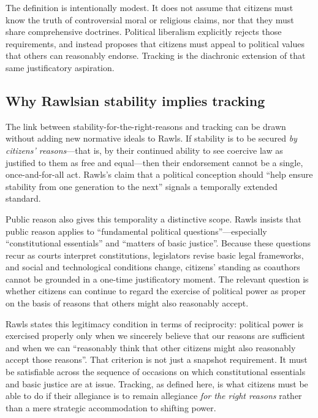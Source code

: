 \documentclass[12pt]{report}
\begin{document}
The definition is intentionally modest. It does not assume that citizens must know the truth of controversial moral or religious claims, nor that they must share comprehensive doctrines. Political liberalism explicitly rejects those requirements, and instead proposes that citizens must appeal to political values that others can reasonably endorse.\parencite[p.~765]{rawls1997public} Tracking is the diachronic extension of that same justificatory aspiration.

\subsection{Why Rawlsian stability implies tracking}

The link between stability-for-the-right-reasons and tracking can be drawn without adding new normative ideals to Rawls. If stability is to be secured \emph{by citizens’ reasons}---that is, by their continued ability to see coercive law as justified to them as free and equal---then their endorsement cannot be a single, once-and-for-all act. Rawls’s claim that a political conception should \enquote{help ensure stability from one generation to the next} signals a temporally extended standard.\parencite[p.~1]{rawls1987overlapping}

Public reason also gives this temporality a distinctive scope. Rawls insists that public reason applies to \enquote{fundamental political questions}---especially \enquote{constitutional essentials} and \enquote{matters of basic justice}.\parencite[p.~767]{rawls1997public} Because these questions recur as courts interpret constitutions, legislators revise basic legal frameworks, and social and technological conditions change, citizens’ standing as coauthors cannot be grounded in a one-time justificatory moment. The relevant question is whether citizens can continue to regard the exercise of political power as proper on the basis of reasons that others might also reasonably accept.

Rawls states this legitimacy condition in terms of reciprocity: political power is exercised properly only when we sincerely believe that our reasons are sufficient and when we can \enquote{reasonably think that other citizens might also reasonably accept those reasons}.\parencite[p.~771]{rawls1997public} That criterion is not just a snapshot requirement. It must be satisfiable across the sequence of occasions on which constitutional essentials and basic justice are at issue. Tracking, as defined here, is what citizens must be able to do if their allegiance is to remain allegiance \emph{for the right reasons} rather than a mere strategic accommodation to shifting power.
\end{document}

